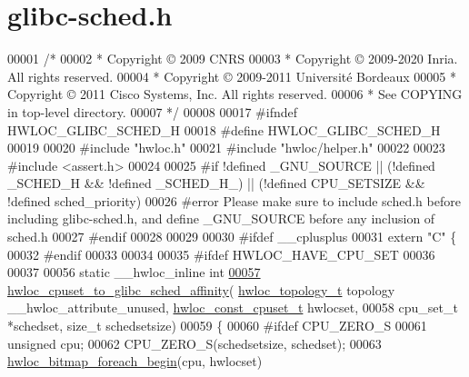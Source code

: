 \hypertarget{a00146_source}{}\section{glibc-\/sched.h}
\label{a00146_source}

\begin{DoxyCode}
00001 \textcolor{comment}{/*}
00002 \textcolor{comment}{ * Copyright © 2009 CNRS}
00003 \textcolor{comment}{ * Copyright © 2009-2020 Inria.  All rights reserved.}
00004 \textcolor{comment}{ * Copyright © 2009-2011 Université Bordeaux}
00005 \textcolor{comment}{ * Copyright © 2011 Cisco Systems, Inc.  All rights reserved.}
00006 \textcolor{comment}{ * See COPYING in top-level directory.}
00007 \textcolor{comment}{ */}
00008 
00017 \textcolor{preprocessor}{#ifndef HWLOC\_GLIBC\_SCHED\_H}
00018 \textcolor{preprocessor}{#define HWLOC\_GLIBC\_SCHED\_H}
00019 
00020 \textcolor{preprocessor}{#include "hwloc.h"}
00021 \textcolor{preprocessor}{#include "hwloc/helper.h"}
00022 
00023 \textcolor{preprocessor}{#include <assert.h>}
00024 
00025 \textcolor{preprocessor}{#if !defined \_GNU\_SOURCE || (!defined \_SCHED\_H && !defined \_SCHED\_H\_) || (!defined CPU\_SETSIZE && !defined
       sched\_priority)}
00026 \textcolor{preprocessor}{#error Please make sure to include sched.h before including glibc-sched.h, and define \_GNU\_SOURCE before
       any inclusion of sched.h}
00027 \textcolor{preprocessor}{#endif}
00028 
00029 
00030 \textcolor{preprocessor}{#ifdef \_\_cplusplus}
00031 \textcolor{keyword}{extern} \textcolor{stringliteral}{"C"} \{
00032 \textcolor{preprocessor}{#endif}
00033 
00034 
00035 \textcolor{preprocessor}{#ifdef HWLOC\_HAVE\_CPU\_SET}
00036 
00037 
00056 \textcolor{keyword}{static} \_\_hwloc\_inline \textcolor{keywordtype}{int}
\hyperlink{a00217_ga88699a0c86c66a9b7baa3468cd9d24c3}{00057} \hyperlink{a00217_ga88699a0c86c66a9b7baa3468cd9d24c3}{hwloc\_cpuset\_to\_glibc\_sched\_affinity}(
      \hyperlink{a00186_ga9d1e76ee15a7dee158b786c30b6a6e38}{hwloc\_topology\_t} topology \_\_hwloc\_attribute\_unused, 
      \hyperlink{a00183_ga1f784433e9b606261f62d1134f6a3b25}{hwloc\_const\_cpuset\_t} hwlocset,
00058                                     cpu\_set\_t *schedset, \textcolor{keywordtype}{size\_t} schedsetsize)
00059 \{
00060 \textcolor{preprocessor}{#ifdef CPU\_ZERO\_S}
00061   \textcolor{keywordtype}{unsigned} cpu;
00062   CPU\_ZERO\_S(schedsetsize, schedset);
00063   \hyperlink{a00205_ga3f6861045a8029ade373510ffa727d2a}{hwloc\_bitmap\_foreach\_begin}(cpu, hwlocset)

\end{DoxyCode}
